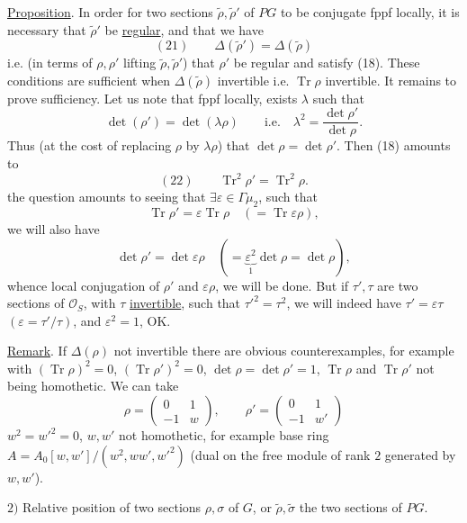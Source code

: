 \uline{Proposition}. In order for two sections
$\widetilde\rho,\widetilde\rho'$ of $PG$ to be
 conjugate fppf locally,
it is necessary 
that $\widetilde\rho'$ be \uline{regular}, and that we have
\margin{$\Big|$}
\[
(21)\qquad
\Delta(\widetilde\rho')=\Delta(\widetilde\rho)
\]
i.e. (in terms of $\rho,\rho'$ lifting
$\widetilde\rho,\widetilde\rho'$) that $\rho'$ be
regular and satisfy (18).
These conditions are sufficient when
$\Delta(\widetilde\rho)$ invertible i.e. $\operatorname{Tr}\rho$ invertible.
It remains to prove sufficiency. Let us note that fppf locally,
exists $\lambda$  such that
\[
\det(\rho')=\det(\lambda\rho)\qquad
\text{i.e.}\quad\lambda^2=\frac{\det\rho'}{\det\rho}.
\]
Thus  (at the cost of replacing $\rho$ by $\lambda\rho$)
that $\det\rho=\det\rho'$.
Then (18) amounts to
\[
(22)\qquad
\operatorname{Tr}^2\rho'=\operatorname{Tr}^2\rho.
\]
 the question amounts to seeing that
$\exists\varepsilon\in\Gamma\mu_2$, such that
\[
\operatorname{Tr}\rho'=\varepsilon\operatorname{Tr}\rho
\quad(=\operatorname{Tr}\varepsilon\rho),
\]
we will also have
\[
\det\rho'=\det\varepsilon\rho
\quad(=\underbrace{\varepsilon^2}_{1}\det\rho=\det\rho),
\]
whence local conjugation of $\rho'$ and $\varepsilon\rho$,
we will be done. But if $\tau',\tau$ are two sections of
$\mathcal O_S$, with $\tau$ \uline{invertible}, such that
$\tau'^2=\tau^2$, we will indeed have
$\tau'=\varepsilon\tau$ $(\varepsilon=\tau'/\tau)$,
and $\varepsilon^2=1$, OK.



\uline{Remark}. If $\Delta(\rho)$ not invertible there are
obvious counterexamples, for example with
$(\operatorname{Tr}\rho)^2=0$,
$(\operatorname{Tr}\rho')^2=0$,
$\det\rho=\det\rho'=1$,
$\operatorname{Tr}\rho$ and $\operatorname{Tr}\rho'$
not being homothetic. We can take
\[
\rho=\begin{pmatrix}0&1\\-1&w\end{pmatrix},
\qquad
\rho'=\begin{pmatrix}0&1\\-1&w'\end{pmatrix}
\]
$w^2=w'^2=0$, $w,w'$ not homothetic, for example
base ring
$A=A_0[w,w']/(w^2,ww',w'^2)$
(dual  on the free module of rank $2$
generated by $w,w'$).

$2)$ Relative position of two sections $\rho,\sigma$
of $G$, or $\widetilde\rho,\widetilde\sigma$ the two sections of $PG$.
\margin{$\big|$}

